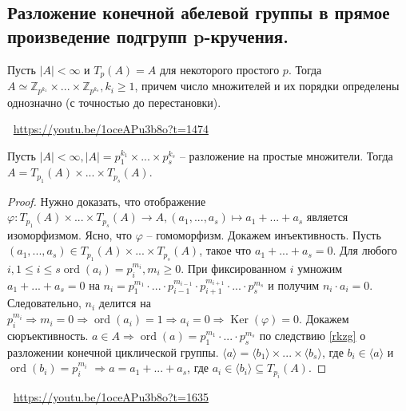 \subsection{Разложение конечной абелевой группы в прямое произведение подгрупп p-кручения.}
\begin{statement} \label{statement10.2.1}
    Пусть $|A| < \infty$ и $T_p(A) = A$ для некоторого простого $p$.
    Тогда $A \simeq \mathbb{Z}_{p^{k_1}} \times ... \times \mathbb{Z}_{p^{k_s}}, k_i \geqslant 1$, причем число множителей и их порядки определены однозначно (с точностью до перестановки).
\end{statement}
\large \faYoutube \normalsize $\>$ \url{https://youtu.be/1oceAPu3b8o?t=1474}
\begin{statement}  \label{statement10.2.2}
    Пусть $|A| < \infty, |A| = p_1^{k_1} \times ... \times p_s^{k_s}$ -- разложение на простые множители. Тогда $A = T_{p_1}(A) \times ... \times T_{p_s}(A)$.
    \begin{proof}
        Нужно доказать, что отображение $\varphi : T_{p_1}(A) \times ... \times T_{p_s}(A) \to A, (a_1, ..., a_s) \mapsto a_1 + ... + a_s$ является изоморфизмом. Ясно, что $\varphi$ -- гомоморфизм. Докажем инъективность. Пусть $(a_1, ..., a_s) \in T_{p_1}(A) \times ... \times T_{p_s}(A)$, такое что $a_1 + ... + a_s = 0$. Для любого $i, 1 \leqslant i \leqslant s \operatorname{ord}(a_i) = p_i^{m_i}, m_i \geqslant 0$. При фиксированном $i$ умножим $a_1 + ... + a_s = 0$ на $n_i = p_1^{m_1} \cdot ... \cdot p_{i-1}^{m_{i-1}} \cdot p_{i+1}^{m_{i+1}} \cdot ... \cdot p_s^{m_s}$ и получим $n_i \cdot a_i = 0$. Следовательно, $n_i$ делится на $p_i^{m_i} \Rightarrow m_i = 0 \Rightarrow \operatorname{ord}(a_i) = 1 \Rightarrow a_i = 0 \Rightarrow \operatorname{Ker}(\varphi) = 0$. Докажем сюръективность. $a \in A \Rightarrow \operatorname{ord}(a) = p_1^{m_1} \cdot ... \cdot p_s^{m_s}$ по следствию \ref{rkzg} о разложении конечной циклической группы.
        $\langle a \rangle = \langle b_1 \rangle \times ... \times \langle b_s \rangle$, где $b_i \in \langle a \rangle$ и $\operatorname{ord}(b_i) = p_i^{m_i}$ $\Rightarrow a = a_1 + ... + a_s$, где $a_i \in \langle b_i \rangle \subseteq T_{p_i}(A)$.
    \end{proof}
\end{statement}
\large \faYoutube \normalsize $\>$ \url{https://youtu.be/1oceAPu3b8o?t=1635}
